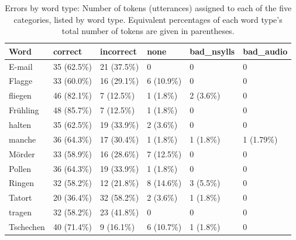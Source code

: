			\begin{table}[tbp]
				\centering
				\caption[Errors by word type]{Errors by word type: Number of tokens (utterances) assigned to each of the five categories, listed by word type. Equivalent percentages of each word type's total number of tokens are given in parentheses.}
				\begin{tabularx}{\textwidth}{lXXXXX}
				\toprule
				Word & correct & incorrect & none & bad\_nsylls & bad\_audio \\	
					\midrule
E-mail 			&	35 (62.5\%)	& 21 (37.5\%) 	&	0 					&	0 				&  0  				\\
Flagge			& 33 (60.0\%)	&	16 (29.1\%)	&	6 (10.9\%)	&	0 		 		&	0 					\\
fliegen 			&	46 (82.1\%)	&	7 (12.5\%) 	&	1 (1.8\%) 		&	2 (3.6\%)	&	0 					\\
Fr\"{u}hling 	&	48 (85.7\%) 	&	7 (12.5\%) 	&	1 (1.8\%)		&	0 				&	0 					\\
halten 			&	35 (62.5\%)	&	19 (33.9\%)	&	2 (3.6\%)		&	0				&	0 					\\
manche		&	36 (64.3\%)	&	17 (30.4\%)	&	1 (1.8\%)		&	1 (1.8\%) 	&	1 (1.79\%)	\\
M\"{o}rder	& 33 (58.9\%)	&	16 (28.6\%)	&	7 (12.5\%)	&	0 				&	0 					\\
Pollen			& 36 (64.3\%)	&	19 (33.9\%)	&	1 (1.8\%)		&	0 				&	0 					\\
Ringen			& 32 (58.2\%)	&	12 (21.8\%)	&	8 (14.6\%)	&	3 (5.5\%)	&	0 					\\
Tatort			& 20 (36.4\%)	&	32 (58.2\%)	&	2 (3.6\%)		&	1 (1.8\%)	&	0 					\\
tragen			& 32 (58.2\%)	&	23 (41.8\%)	&	0 					&	0 				&	0 					\\
Tschechen 	&	40 (71.4\%)	&	9 (16.1\%)	 &	6 (10.7\%)	&	1 (1.8\%) 	&	0  				\\
					\bottomrule
				\end{tabularx}
				\label{tab:results:wordtype}
			\end{table}
			

